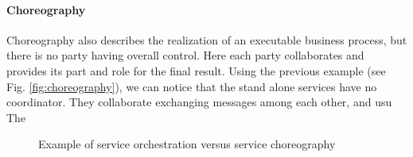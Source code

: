 \paragraph{Choreography}
Choreography also describes the realization of an executable business process, but there is no party having overall control. Here each party collaborates and provides its part and role for the final result. Using the previous example (see Fig. \ref{fig:choreography}), we can notice that the stand alone services have no coordinator. They collaborate exchanging messages among each other, and usu 
The 
 \begin{figure}
\centering
{}
\hspace{2mm}
\caption{Example of service orchestration versus service choreography}
\label{fig:OrchAndChor}
\end{figure} 
